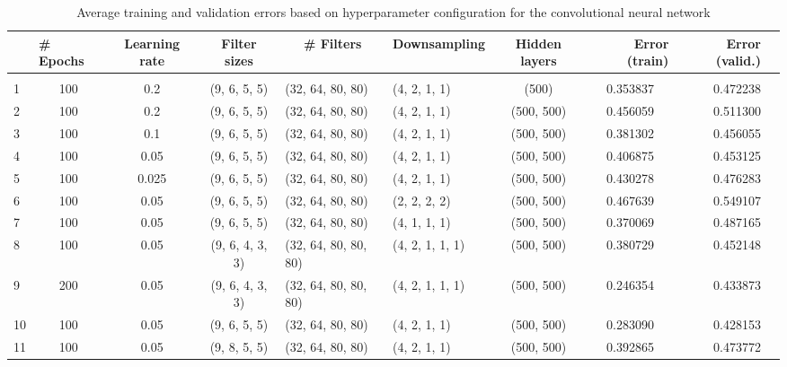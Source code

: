 \documentclass{acm_proc_article-sp}
\begin{document}
\begin{table}[h]
\caption{Average training and validation errors based on hyperparameter configuration for the convolutional neural network}
\label{tab:convnet_params}
\begin{center}
\begin{adjustbox}{width=1\textwidth}
\begin{tabular}{lcccllcc|rr}

&\multicolumn{1}{l}{\bf \# Epochs}
&\multicolumn{1}{c}{\bf Learning rate}
&\multicolumn{1}{c}{\bf Filter sizes}
&\multicolumn{1}{c}{\bf \# Filters}
&\multicolumn{1}{c}{\bf Downsampling}
&\multicolumn{1}{c}{\bf Hidden layers}
&\multicolumn{1}{r}{\bf Error (train)}
&\multicolumn{1}{r}{\bf Error (valid.)}
\\ \hline \\	
1 & 100 & 0.2 & (9, 6, 5, 5) & (32, 64, 80, 80) & (4, 2, 1, 1) & (500) & 0.353837 & 0.472238 \\
2 & 100 & 0.2 & (9, 6, 5, 5) & (32, 64, 80, 80) & (4, 2, 1, 1) & (500, 500) & 0.456059 & 0.511300 \\
3 & 100 & 0.1 & (9, 6, 5, 5) & (32, 64, 80, 80) & (4, 2, 1, 1) & (500, 500) & 0.381302 & 0.456055 \\
4 & 100 & 0.05 & (9, 6, 5, 5) & (32, 64, 80, 80) & (4, 2, 1, 1) & (500, 500) & 0.406875 & 0.453125 \\
5 & 100 & 0.025 & (9, 6, 5, 5) & (32, 64, 80, 80) & (4, 2, 1, 1) & (500, 500) & 0.430278 & 0.476283 \\
6 & 100 & 0.05 & (9, 6, 5, 5) & (32, 64, 80, 80) & (2, 2, 2, 2) & (500, 500) & 0.467639 & 0.549107 \\
7 & 100 & 0.05 & (9, 6, 5, 5) & (32, 64, 80, 80) & (4, 1, 1, 1) & (500, 500) & 0.370069 & 0.487165 \\
8 & 100 & 0.05 & (9, 6, 4, 3, 3) & (32, 64, 80, 80, 80) & (4, 2, 1, 1, 1) & (500, 500) & 0.380729 & 0.452148 \\
9 & 200 & 0.05 & (9, 6, 4, 3, 3) & (32, 64, 80, 80, 80) & (4, 2, 1, 1, 1) & (500, 500) & 0.246354 & 0.433873 \\
10 & 100 & 0.05 & (9, 6, 5, 5) & (32, 64, 80, 80) & (4, 2, 1, 1) & (500, 500) & 0.283090 & 0.428153 \\
11 & 100 & 0.05 & (9, 8, 5, 5) & (32, 64, 80, 80) & (4, 2, 1, 1) & (500, 500) & 0.392865 & 0.473772 
\end{tabular}
\end{adjustbox}
\end{center}
\end{table}


\balancecolumns
\end{document}
